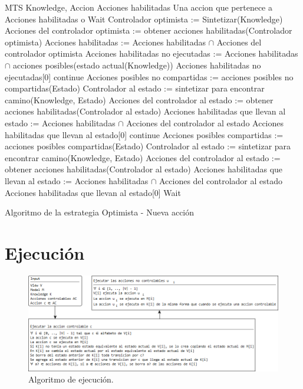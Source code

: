 \begin{algorithm}
\begin{algorithmic}
\REQUIRE MTS Knowledge, {Accion} Acciones habilitadas
\ENSURE Una accion que pertenece a Acciones habilitadas o Wait
\STATE Controlador optimista := Sintetizar(Knowledge)
\STATE Acciones del controlador optimista := obtener acciones habilitadas(Controlador optimista)
\STATE Acciones habilitadas := Acciones habilitadas $\cap$ Acciones del controlador optimista
\STATE Acciones habilitadas no ejecutadas := Acciones habilitadas $\cap$ acciones posibles(estado actual(Knowledge))
\RETURN Acciones habilitadas no ejecutadas[0]
\ELSE
{}
\STATE continue
\ENDIF
\STATE Acciones posibles no compartidas := acciones posibles no compartidas(Estado)
\STATE Controlador al estado := sintetizar para encontrar camino(Knowledge, Estado)
\STATE Acciones del controlador al estado := obtener acciones habilitadas(Controlador al estado)
\STATE Acciones habilitadas que llevan al estado := Acciones habilitadas $\cap$ Acciones del controlador al estado
\RETURN Acciones habilitadas que llevan al estado[0]
\ENDIF
\ENDIF
\ENDFOR
{}
\STATE continue
\ENDIF
\STATE Acciones posibles compartidas := acciones posibles compartidas(Estado)
\STATE Controlador al estado := sintetizar para encontrar camino(Knowledge, Estado)
\STATE Acciones del controlador al estado := obtener acciones habilitadas(Controlador al estado)
\STATE Acciones habilitadas que llevan al estado := Acciones habilitadas $\cap$ Acciones del controlador al estado
\RETURN Acciones habilitadas que llevan al estado[0]
\ENDIF
\ENDIF
\ENDFOR
\RETURN Wait
\ENDIF
\end{algorithmic}
\caption{Algoritmo de la estrategia Optimista - Nueva acción}
\end{algorithm}

\newpage

\section{Ejecución}

\begin{figure}[H]
  \centering
    \includegraphics[width=1.0\textwidth]{Imagenes/Algoritmo/Algoritmo_ejecutar.png}
  \caption{Algoritmo de ejecución.}
  \label{fig:Algoritmo_ejecutar}
\end{figure}

